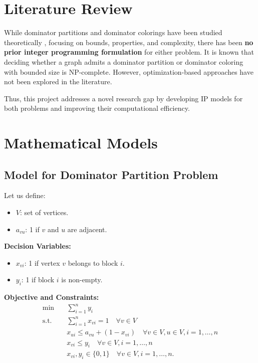 \documentclass[12pt]{article}
\begin{document}
\section{Literature Review}

While dominator partitions and dominator colorings have been studied theoretically \cite{dominator_partitions}, focusing on bounds, properties, and complexity, there has been \textbf{no prior integer programming formulation} for either problem. It is known that deciding whether a graph admits a dominator partition or dominator coloring with bounded size is NP-complete. However, optimization-based approaches have not been explored in the literature.

Thus, this project addresses a novel research gap by developing IP models for both problems and improving their computational efficiency.

\section{Mathematical Models}

\subsection{Model for Dominator Partition Problem}
Let us define:
\begin{itemize}[label=, noitemsep]
    \item $V$: set of vertices.
    \item $a_{vu}$: 1 if $v$ and $u$ are adjacent.
\end{itemize}

\textbf{Decision Variables:}
\begin{itemize}[label=, noitemsep]
    \item $x_{vi}$: 1 if vertex $v$ belongs to block $i$.
    \item $y_i$: 1 if block $i$ is non-empty.
\end{itemize}

\textbf{Objective and Constraints:}
\begin{align*}
    \min \quad & \sum_{i=1}^{n} y_i \\
    \text{s.t.} \quad
    & \sum_{i=1}^{n} x_{vi} = 1 \quad \forall v \in V \\
    & x_{ui} \leq a_{vu} + (1 - x_{vi}) \quad \forall v \in V, u \in V, i=1,\dots,n \\
    & x_{vi} \leq y_i \quad \forall v \in V, i=1,\dots,n \\
    & x_{vi}, y_i \in \{0,1\} \quad \forall v \in V, i=1,\dots,n.
\end{align*}
\end{document}
